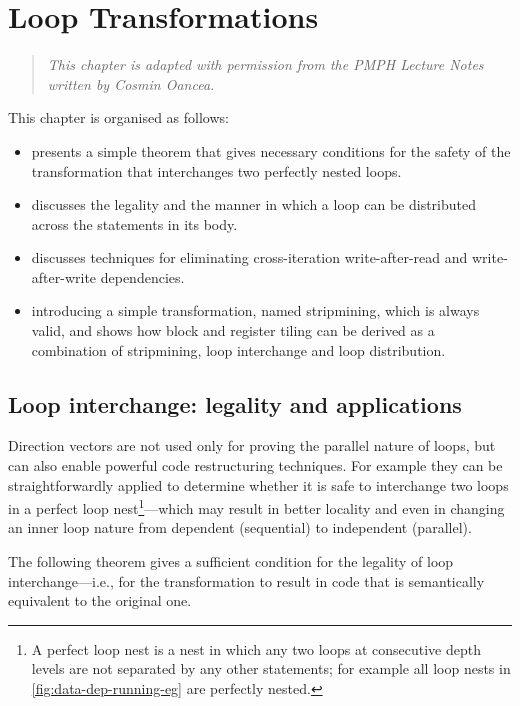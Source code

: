 \lstset{language=C}

\chapter{Loop Transformations}
\label{chap:loop-transformations}

\begin{quote}
  \emph{This chapter is adapted with permission from the PMPH Lecture
    Notes written by Cosmin Oancea.}
\end{quote}

This chapter is organised as follows:
\begin{itemize}
\item {} presents a simple theorem that gives
  necessary conditions for the safety of the transformation that
  interchanges two perfectly nested loops.
\item {} discusses the legality and
  the manner in which a loop can be distributed across the
  statements in its body.
\item {} discusses techniques for
  eliminating cross-iteration write-after-read and
  write-after-write dependencies.
\item {} introducing a simple
  transformation, named stripmining, which is always valid, and
  shows how block and register tiling can be derived as a
  combination of stripmining, loop interchange and loop
  distribution.
\end{itemize}

\section{Loop interchange: legality and applications}
\label{sec:loop-interch}

Direction vectors are not used only for proving the parallel nature of
loops, but can also enable powerful code restructuring techniques. For
example they can be straightforwardly applied to determine whether it
is safe to interchange two loops in a perfect loop nest\footnote{ A
  perfect loop nest is a nest in which any two loops at consecutive
  depth levels are not separated by any other statements; for example
  all loop nests in \cref{fig:data-dep-running-eg} are perfectly
  nested.  }---which may result in better locality and even in
changing an inner loop nature from dependent (sequential) to
independent (parallel).

The following theorem gives a sufficient condition for the
legality of loop interchange---i.e., for the transformation
to result in code that is semantically equivalent to the original one.

